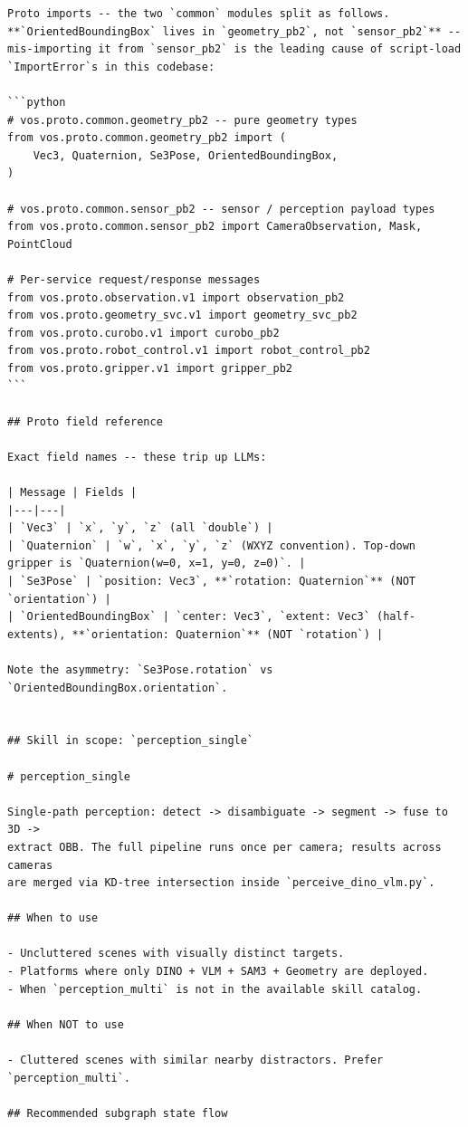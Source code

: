 \begin{lstlisting}
Proto imports -- the two `common` modules split as follows.
**`OrientedBoundingBox` lives in `geometry_pb2`, not `sensor_pb2`** --
mis-importing it from `sensor_pb2` is the leading cause of script-load
`ImportError`s in this codebase:

```python
# vos.proto.common.geometry_pb2 -- pure geometry types
from vos.proto.common.geometry_pb2 import (
    Vec3, Quaternion, Se3Pose, OrientedBoundingBox,
)

# vos.proto.common.sensor_pb2 -- sensor / perception payload types
from vos.proto.common.sensor_pb2 import CameraObservation, Mask, PointCloud

# Per-service request/response messages
from vos.proto.observation.v1 import observation_pb2
from vos.proto.geometry_svc.v1 import geometry_svc_pb2
from vos.proto.curobo.v1 import curobo_pb2
from vos.proto.robot_control.v1 import robot_control_pb2
from vos.proto.gripper.v1 import gripper_pb2
```

## Proto field reference

Exact field names -- these trip up LLMs:

| Message | Fields |
|---|---|
| `Vec3` | `x`, `y`, `z` (all `double`) |
| `Quaternion` | `w`, `x`, `y`, `z` (WXYZ convention). Top-down gripper is `Quaternion(w=0, x=1, y=0, z=0)`. |
| `Se3Pose` | `position: Vec3`, **`rotation: Quaternion`** (NOT `orientation`) |
| `OrientedBoundingBox` | `center: Vec3`, `extent: Vec3` (half-extents), **`orientation: Quaternion`** (NOT `rotation`) |

Note the asymmetry: `Se3Pose.rotation` vs `OrientedBoundingBox.orientation`.


## Skill in scope: `perception_single`

# perception_single

Single-path perception: detect -> disambiguate -> segment -> fuse to 3D ->
extract OBB. The full pipeline runs once per camera; results across cameras
are merged via KD-tree intersection inside `perceive_dino_vlm.py`.

## When to use

- Uncluttered scenes with visually distinct targets.
- Platforms where only DINO + VLM + SAM3 + Geometry are deployed.
- When `perception_multi` is not in the available skill catalog.

## When NOT to use

- Cluttered scenes with similar nearby distractors. Prefer `perception_multi`.

## Recommended subgraph state flow


\end{lstlisting}
